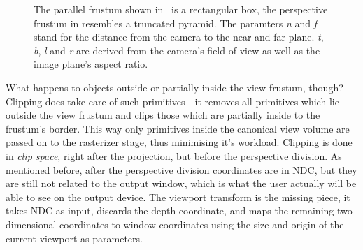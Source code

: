 \begin{figure}
\centering
{}
\caption[Parallel and Perspective Frustum]{The parallel frustum shown
in~ is a rectangular box, the perspective 
frustum in  resembles a truncated
pyramid. The paramters \textit{n} and \textit{f} stand for the distance from the
camera to the near and far plane. \textit{t}, \textit{b}, \textit{l} and
\textit{r} are derived from the camera's field of view as well as the image
plane's aspect ratio.}
\label{fig:parallelandperspectivefrustum}
\end{figure}

What happens to objects outside or partially inside the view frustum, though?
Clipping does take care of such primitives - it removes all primitives which
lie outside the view frustum and clips those which are partially inside to the
frustum's border. This way only primitives inside the canonical view volume are
passed on to the rasterizer stage, thus minimising it's workload. Clipping is
done in \textit{clip space}, right after the projection, but before the
perspective division. As mentioned before, after the perspective division
coordinates are in NDC, but they are still not related to the output window,
which is what the user actually will be able to see on the output device. The
viewport transform is the missing piece, it takes NDC as input, discards the
depth coordinate, and maps the remaining two-dimensional coordinates to
window coordinates using the size and origin of the current viewport as
parameters.

